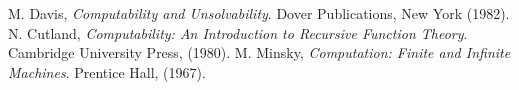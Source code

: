 \documentclass[12pt]{article}
\begin{document}
\begin{thebibliography}{9}
 M. Davis, {\em Computability and Unsolvability}. Dover Publications, New York (1982).
 N. Cutland, {\em Computability: An Introduction to Recursive Function Theory}. Cambridge University Press, (1980).
 M. Minsky, {\em Computation: Finite and Infinite Machines}.  Prentice Hall, (1967).
\end{thebibliography}
\end{document}
